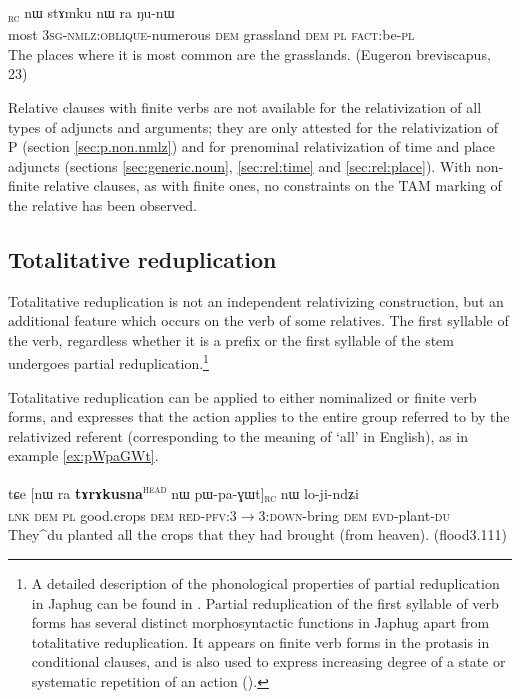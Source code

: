 \documentclass[oldfontcommands,oneside,a4paper,11pt]{article}
\newcommand{\ipa}[1]{{\phon #1}} %
\newcommand{\topic}{\textsc{dem}}
\newcommand{\tete}{\textsuperscript{\textsc{head}}}
\newcommand{\rc}{\textsubscript{\textsc{rc}}}
\begin{document}
\begin{exe}
   \ex \label{ex:WsAdAn}
 \gll  
  [\ipa{stu}   	\ipa{ɯ-sɤ-dɤn}]\rc{}   	\ipa{nɯ}   	\ipa{stɤmku}   	\ipa{nɯ} \ipa{ra}   	\ipa{ŋu-nɯ}   \\
most \textsc{3sg-nmlz:oblique}-numerous \topic{} grassland \topic{} \textsc{pl} \textsc{fact}:be-\textsc{pl} \\
\glt The places where it is most common are the grasslands. (Eugeron breviscapus, 23)
    \end{exe}
    

	  
	Relative clauses with finite verbs are not available for the relativization of all types of adjuncts and arguments; they are only attested for the relativization of P (section \ref{sec:p.non.nmlz}) and for prenominal relativization of time and place adjuncts (sections \ref{sec:generic.noun}, \ref{sec:rel:time} and \ref{sec:rel:place}). With non-finite relative clauses, as with finite ones, no constraints on the TAM marking of the relative has been observed.
	
	
\subsection{Totalitative reduplication} \label{sec:redp}
Totalitative reduplication is not an independent relativizing construction, but an additional feature which occurs on the verb of some relatives. The first syllable of the verb, regardless whether it is a prefix or the first syllable of the stem undergoes partial reduplication.\footnote{A detailed description of the phonological properties of partial reduplication in Japhug   can be found in \citet{jacques04these, jacques07redupl}. Partial reduplication of the first syllable of   verb forms has several distinct morphosyntactic functions in Japhug apart from totalitative reduplication. It appears on  finite verb forms in the protasis in conditional clauses, and is also used to express increasing degree of a state or systematic repetition of an action (\citealt{jacques07redupl}).}


Totalitative reduplication  can be applied to either nominalized or finite verb forms, and expresses that the action applies to the entire group referred to by the relativized referent (corresponding to the meaning of `all' in English), as in example \ref{ex:pWpaGWt}.

  \begin{exe}
\ex \label{ex:pWpaGWt}
\gll
\ipa{tɕe}  	[\ipa{nɯ} \ipa{ra}  	\textbf{\ipa{tɤrɤkusna}}\tete{}  	\ipa{nɯ}  	\ipa{pɯ-pa-ɣɯt}]\rc{}  	\ipa{nɯ}  	\ipa{lo-ji-ndʑi}  \\
\textsc{lnk} \textsc{dem} \textsc{pl} good.crops \topic{} \textsc{red-pfv:3$\rightarrow$3:down}-bring \topic{} \textsc{evd}-plant-\textsc{du} \\
\glt They^{du} planted all the crops that they had brought (from heaven). (flood3.111)
\end{exe}
 
\end{document}
